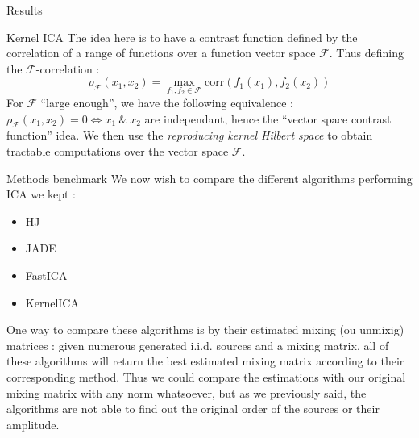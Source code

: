 \documentclass{beamer}
\begin{document}
\begin{frame}{}
\begin{columns}[T]
\begin{column}{.48\linewidth}
\begin{block}{Results}
\begin{figure}
\end{figure}
\end{block}
\begin{block}{Kernel ICA}
	The idea here is to have a contrast function defined by the correlation of a range of functions over a function vector space $\mathcal{F}$. Thus defining the $\mathcal{F}$-correlation :
	\begin{equation*}
		\rho_{\mathcal{F}} (x_1,x_2) = \max\limits_{f_1,f_2 \in \mathcal{F}} \text{corr}(f_1(x_1),f_2(x_2))
	\end{equation*}
For $\mathcal{F}$ ``large enough'', we have the following equivalence : $\rho_{\mathcal{F}} (x_1,x_2) = 0 \Longleftrightarrow x_1 \ \& \ x_2$ are independant, hence the ``vector space contrast function'' idea.
	We then use the \textit{reproducing kernel Hilbert space} to obtain tractable computations over the vector space $\mathcal{F}$.
\end{block}

\begin{block}{Methods benchmark}
	We now wish to compare the different algorithms performing ICA we kept :\begin{itemize}
		\item HJ
		\item JADE
		\item FastICA
		\item KernelICA
\end{itemize}
One way to compare these algorithms is by their estimated mixing (ou unmixig) matrices : given numerous generated i.i.d. sources and a mixing matrix, all of these algorithms will return the best estimated mixing matrix according to their corresponding method.
Thus we could compare the estimations with our original mixing matrix with any norm whatsoever, but as we previously said, the algorithms are not able to find out the original order of the sources or their amplitude.
\end{block}
\end{column}


\end{columns}
\end{frame}
\end{document}

